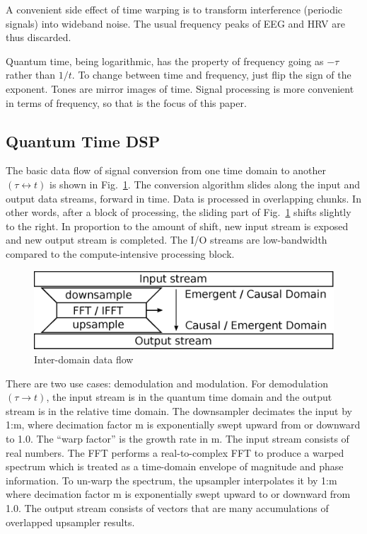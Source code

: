 A convenient side effect of time warping is to transform interference
(periodic signals) into wideband noise.
The usual frequency peaks of EEG and HRV are thus discarded.

Quantum time, being logarithmic, has the property of frequency going as
$-\tau$ rather than $1/t$.
To change between time and frequency, just flip the sign of the exponent.
Tones are mirror images of time.
Signal processing is more convenient in terms of frequency,
so that is the focus of this paper.

\subsection{\label{sec:level1}Quantum Time DSP}

The basic data flow of signal conversion from one time domain to another
$(\tau \leftrightarrow t)$ is shown in Fig.~\ref{fig:sled}.
The conversion algorithm slides along the input and output data streams,
forward in time.
Data is processed in overlapping chunks.
In other words, after a block of processing,
the sliding part of Fig.~\ref{fig:sled} shifts slightly to the right.
In proportion to the amount of shift,
new input stream is exposed and new output stream is completed.
The I/O streams are low-bandwidth compared to the compute-intensive
processing block.

\begin{figure}
	\centering
	\includegraphics[width=0.95\linewidth]{../source/sled_e}
	\caption[Quantum to Relative Time Translation Flow]{Inter-domain data flow}
	\label{fig:sled}
\end{figure}

There are two use cases: demodulation and modulation.
For demodulation $(\tau \rightarrow t)$, the input stream is in the quantum
time domain and the output stream is in the relative time domain.
The downsampler decimates the input by 1:m, where decimation factor m is
exponentially swept upward from or downward to 1.0.
The ``warp factor'' is the growth rate in m.
The input stream consists of real numbers.
The FFT performs a real-to-complex FFT to produce a warped spectrum which is
treated as a time-domain envelope of magnitude and phase information.
To un-warp the spectrum, the upsampler interpolates it by 1:m where decimation
factor m is exponentially swept upward to or downward from 1.0.
The output stream consists of vectors that are many accumulations of overlapped
upsampler results.


